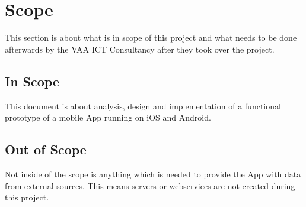 \section{Scope}
This section is about what is in scope of this project and what needs to be done afterwards by the VAA ICT Consultancy after they took over the project.
\subsection{In Scope}
This document is about analysis, design and implementation of a functional prototype of a mobile App running on iOS and Android. 
\subsection{Out of Scope}
Not inside of the scope is anything which is needed to provide the App with data from external sources. This means servers or webservices are not created during this project. 